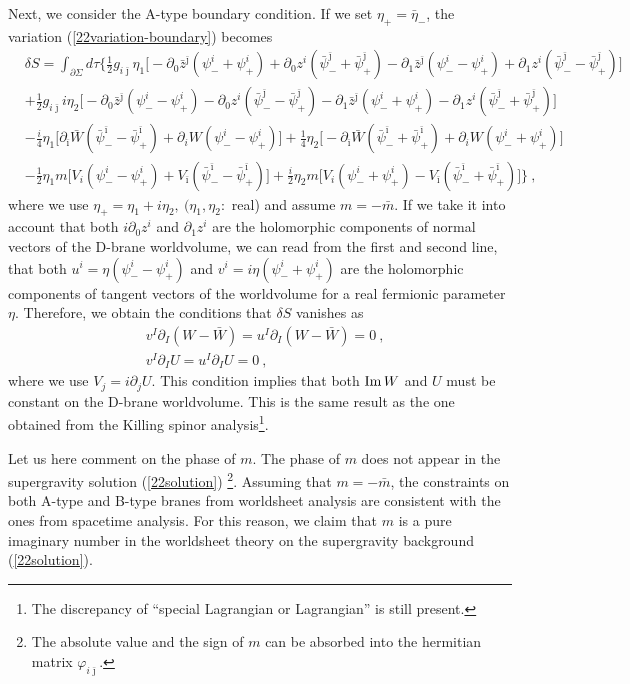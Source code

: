 \documentclass[a4paper,12pt]{article}
\numberwithin{equation}{section}
\newcommand{\del}{\partial}
\newcommand{\ib}{\bar{\imath}}
\newcommand{\jb}{\bar{\jmath}}
\newcommand{\mb}{\bar{m}}
\newcommand{\zb}{\bar{z}}
\newcommand{\vp}{\varphi}
\DeclareMathOperator*{\im}{{\rm Im}}
\newcommand{\nn}{\nonumber\\}
\newcommand{\psb}{\bar{\psi}}
\newcommand{\etb}{\bar{\eta}}
\newcommand{\Wb}{\bar{W}}
\begin{document}
Next, we consider the A-type boundary condition. 
If we set $\eta_{+}=\etb_{-}$,
the variation (\ref{22variation-boundary}) becomes
\begin{align}
 &\delta S = \int_{\del \Sigma}d\tau\Bigg\{
\frac12 g_{i\jb}\eta_{1}\Big[
-\del_{0}\zb^{\jb}(\psi_{-}^{i}+\psi_{+}^{i})
+\del_{0} z^{ i }(\psb_{-}^{\jb}+\psb_{+}^{\jb})
-\del_{1}\zb^{\jb}(\psi_{-}^{i}-\psi_{+}^{i})
+\del_{1} z^{ i }(\psb_{-}^{\jb}-\psb_{+}^{\jb})
\Big]
\nn&
+\frac12 g_{i\jb}i\eta_{2}\Big[
-\del_{0}\zb^{\jb}(\psi_{-}^{i}-\psi_{+}^{i})
-\del_{0} z^{ i }(\psb_{-}^{\jb}-\psb_{+}^{\jb})
-\del_{1}\zb^{\jb}(\psi_{-}^{i}+\psi_{+}^{i})
-\del_{1} z^{ i }(\psb_{-}^{\jb}+\psb_{+}^{\jb})
\Big]
\nn&
   -\frac{i}{4}\eta_{1}\Big[
      \del_{\ib}\Wb(\psb_{-}^{\ib}-\psb_{+}^{\ib})
     +\del_{i} W (\psi_{-}^{i}-\psi_{+}^{i})
   \Big]
   +\frac{1}{4}\eta_{2}\Big[
     -\del_{\ib}\Wb(\psb_{-}^{\ib}+\psb_{+}^{\ib})
     +\del_{i} W (\psi_{-}^{i}+\psi_{+}^{i})
   \Big] 
\nn&
  -\frac12\eta_{1} m \Big[
    V_{i}(\psi_{-}^{i}-\psi_{+}^{i})
    +V_{\ib}(\psb_{-}^{\ib}-\psb_{+}^{\ib})
   \Big]
  +\frac{i}{2}\eta_{2} m \Big[
    V_{i}(\psi_{-}^{i}+\psi_{+}^{i})
   -V_{\ib}(\psb_{-}^{\ib}+\psb_{+}^{\ib})
   \Big]
 \Bigg\}~,
\end{align}
where we use $\eta_{+}=\eta_1+i\eta_2,\ (\eta_1,\eta_2:$ real) and
assume $m=-\mb$. If we take it into account that
both $i\del_{0}z^{i}$ and $\del_{1}z^{i}$ are the holomorphic components of
normal vectors of the D-brane worldvolume,
we can read from the first and second line, that
both $u^{i}=\eta(\psi_{-}^{i}-\psi_{+}^{i})$
and $v^{i}=i\eta(\psi_{-}^{i}+\psi_{+}^{i})$
are the holomorphic components of tangent vectors of the worldvolume for a
real fermionic parameter $\eta$.
Therefore, we obtain the conditions that $\delta S$ vanishes as
\begin{align}
 &v^{I}\del_{I} (W-\Wb)=u^{I}\del_{I} (W-\Wb)=0 ~, \nn
 &v^{I} \del_{I} U = u^{I} \del_{I} U =0~,
\end{align}
where we use $V_{j}=i\del_{j} U$. This condition implies that
both $\im W$ and $U$ must be constant on the D-brane worldvolume.
This is the same result as the one obtained from the Killing spinor 
analysis\footnote{The discrepancy of ``special Lagrangian or
Lagrangian'' is still present.}.

Let us here comment on the phase of $m$. The phase of $m$ does not appear in
the supergravity solution (\ref{22solution})%
\footnote{The absolute value and the sign of $m$ can be absorbed 
into the hermitian matrix $\vp_{i\jb}$.}.
Assuming that $m=-\mb$, the constraints on
both A-type and B-type branes from worldsheet analysis
are consistent with the ones from spacetime analysis. 
For this reason, we claim that $m$
is a pure imaginary number in the worldsheet theory on the supergravity
background (\ref{22solution}).
\end{document}
